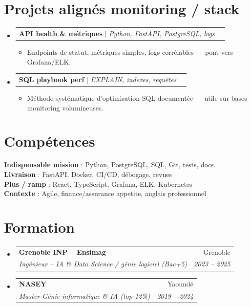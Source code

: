 \documentclass[a4paper,10.5pt]{article}
\makeatletter
\newcommand{\resumeItem}[1]{\item\small{#1}}
\newcommand{\resumeSubheading}[4]{\vspace{2.5pt}\item\begin{tabular*}{0.97\textwidth}[t]{l@{\extracolsep{\fill}}r}\textbf{#1}&{#2}\\\textit{\small #3}&\textit{\small #4}\\\end{tabular*}\vspace{1pt}}
\newcommand{\resumeProjectHeading}[2]{\vspace{1.5pt}\item\begin{tabular*}{0.97\textwidth}{l@{\extracolsep{\fill}}r}\small #1&#2\\\end{tabular*}\vspace{1pt}}
\newcommand{\resumeSubHeadingListStart}{\begin{itemize}[leftmargin=0.08in,label={}]}
\newcommand{\resumeSubHeadingListEnd}{\end{itemize}}
\makeatother
\begin{document}
\section{Projets align\'es monitoring / stack}
\resumeSubHeadingListStart
  \resumeProjectHeading{\textbf{API health \& m\'etriques} $|$ \emph{Python, FastAPI, PostgreSQL, logs}}{}
  \begin{itemize}\resumeItem{Endpoints de statut, m\'etriques simples, logs corr\'elables --- pont vers Grafana/ELK.}\end{itemize}
  \resumeProjectHeading{\textbf{SQL playbook perf} $|$ \emph{EXPLAIN, indexes, requ\^etes}}{}
  \begin{itemize}\resumeItem{M\'ethode syst\'ematique d'optimisation SQL document\'ee --- utile sur bases monitoring volumineuses.}\end{itemize}
\resumeSubHeadingListEnd

\section{Comp\'etences}
\begin{itemize}[leftmargin=0.08in,label={}]\small{\item{
\textbf{Indispensable mission} : Python, PostgreSQL, SQL, Git, tests, docs \\
\textbf{Livraison} : FastAPI, Docker, CI/CD, d\'ebogage, revues \\
\textbf{Plus / ramp} : React, TypeScript, Grafana, ELK, Kubernetes \\
\textbf{Contexte} : Agile, finance/assurance appetite, anglais professionnel
}}\end{itemize}

\section{Formation}
\resumeSubHeadingListStart
  \resumeSubheading{Grenoble INP -- Ensimag}{Grenoble}{Ing\'enieur -- IA \& Data Science / g\'enie logiciel (Bac+5)}{2023 -- 2025}
  \resumeSubheading{NASEY}{Yaound\'e}{Master G\'enie informatique \& IA (top 12\%)}{2019 -- 2024}
\resumeSubHeadingListEnd
\end{document}
